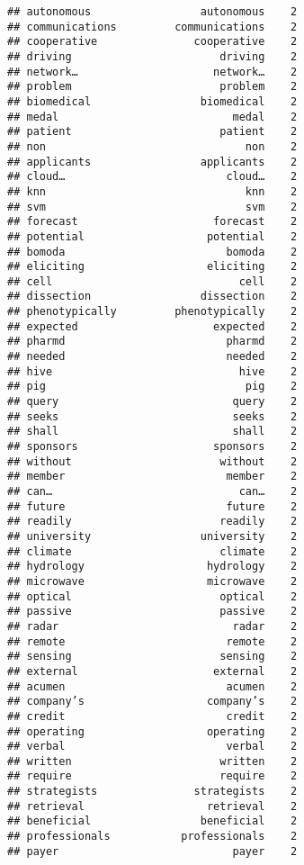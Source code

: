 \documentclass[]{article}
\begin{document}
\begin{verbatim}
## autonomous                 autonomous    2
## communications         communications    2
## cooperative               cooperative    2
## driving                       driving    2
## network…                     network…    2
## problem                       problem    2
## biomedical                 biomedical    2
## medal                           medal    2
## patient                       patient    2
## non                               non    2
## applicants                 applicants    2
## cloud…                         cloud…    2
## knn                               knn    2
## svm                               svm    2
## forecast                     forecast    2
## potential                   potential    2
## bomoda                         bomoda    2
## eliciting                   eliciting    2
## cell                             cell    2
## dissection                 dissection    2
## phenotypically         phenotypically    2
## expected                     expected    2
## pharmd                         pharmd    2
## needed                         needed    2
## hive                             hive    2
## pig                               pig    2
## query                           query    2
## seeks                           seeks    2
## shall                           shall    2
## sponsors                     sponsors    2
## without                       without    2
## member                         member    2
## can…                             can…    2
## future                         future    2
## readily                       readily    2
## university                 university    2
## climate                       climate    2
## hydrology                   hydrology    2
## microwave                   microwave    2
## optical                       optical    2
## passive                       passive    2
## radar                           radar    2
## remote                         remote    2
## sensing                       sensing    2
## external                     external    2
## acumen                         acumen    2
## company’s                   company’s    2
## credit                         credit    2
## operating                   operating    2
## verbal                         verbal    2
## written                       written    2
## require                       require    2
## strategists               strategists    2
## retrieval                   retrieval    2
## beneficial                 beneficial    2
## professionals           professionals    2
## payer                           payer    2

\end{verbatim}
\end{document}
